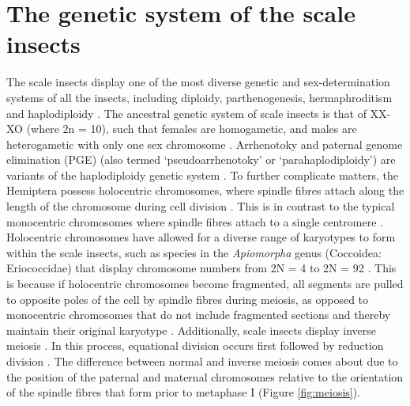 \section{The genetic system of the scale insects}
\label{appendix:geneticSystem}
The scale insects display one of the most diverse genetic and sex-determination systems of all the insects, including diploidy, parthenogenesis, hermaphroditism and haplodiploidy \citep{Burt2009,Ross2012}. The ancestral genetic system of scale insects is that of XX-XO (where 2n = 10), such that females are homogametic, and males are heterogametic with only one sex chromosome \citep{Hughes-Schrader1948, Nur}. 
Arrhenotoky and paternal genome elimination (PGE) (also termed ‘pseudoarrhenotoky’ or ‘parahaplodiploidy’) are variants of the haplodiploidy genetic system \citep{Haig1993,Gullan1997, Normark2004, Burt2009, Ross2010GenomicSystems}. To further complicate matters, the Hemiptera possess holocentric chromosomes, where spindle fibres attach along the length of the chromosome during cell division \citep{Hughes-Schrader1948}. This is in contrast to the typical monocentric chromosomes where spindle fibres attach to a single centromere \citep{Melters2012}. Holocentric chromosomes have allowed for a diverse range of karyotypes to form within the scale insects, such as species in the \textit{Apiomorpha} genus (Coccoidea: Eriococcidae) that display chromosome numbers from 2N = 4 to 2N = 92 \citep{Cook2000}. This is because if holocentric chromosomes become fragmented, all segments are pulled to opposite poles of the cell by spindle fibres during meiosis, as opposed to monocentric chromosomes that do not include fragmented sections and thereby maintain their original karyotype \citep{Melters2012}.  Additionally, scale insects display inverse meiosis \citep{Hughes-Schrader1948, Chandra1962, Bongiorni2004}. In this process, equational division occurs first followed by reduction division \citep{Wrensch1994, Bongiorni2004}. The difference between normal and inverse meiosis comes about due to the position of the paternal and maternal chromosomes relative to the orientation of the spindle fibres that form prior to metaphase I \citep{Wrensch1994} (Figure \ref{fig:meiosis}).

\vspace{1cm}

